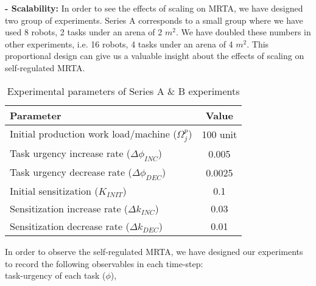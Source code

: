 \documentclass{intech}
\begin{document}
\textbf{- Scalability:} In order to see the effects of scaling on MRTA, we have designed two group of experiments. Series A corresponds to a small group where we have used 8 robots, 2 tasks under an arena of 2 $m^2$. We have doubled these numbers in other experiments, i.e. 16 robots, 4 tasks under an arena of 4 $m^2$. This proportional design can give us a valuable insight about the effects of scaling on self-regulated MRTA. 
\begin{table}
\caption{Experimental parameters of Series A \& B experiments}
\label{table:params}
\begin{center}
\begin{tabular}{|p{2in}|c|}
\hline Parameter & Value\\
\hline Initial production work load/machine ($\Omega_{j}^{p}$) & 100 unit \\
\hline Task urgency increase rate ($\Delta\phi_{INC}$) & 0.005\\
\hline Task urgency decrease rate ($\Delta\phi_{DEC}$) & 0.0025\\
\hline Initial sensitization ($K_{INIT}$) & 0.1\\
\hline Sensitization increase rate ($\Delta k_{INC}$) & 0.03\\
\hline Sensitization decrease rate ($\Delta k_{DEC}$) & 0.01\\
\hline
\end{tabular}
\end{center}
\end{table}
In order to observe the self-regulated MRTA, we have designed our experiments to record the following  observables in each time-step:\\
task-urgency of each task ($\phi$),%
\end{document}
